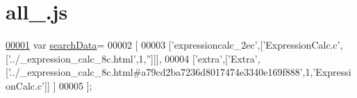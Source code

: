 \hypertarget{all__2_8js_source}{\section{all\+\_.\+js}
\label{all__2_8js_source}
}

\begin{DoxyCode}
\hypertarget{all__2_8js_source_l00001}{}\hyperlink{all__2_8js_ad01a7523f103d6242ef9b0451861231e}{00001} var \hyperlink{all__2_8js_ad01a7523f103d6242ef9b0451861231e}{searchData}=
00002 [
00003   [\textcolor{stringliteral}{'expressioncalc\_2ec'},[\textcolor{stringliteral}{'ExpressionCalc.c'},[\textcolor{stringliteral}{'../\_expression\_calc\_8c.html'},1,\textcolor{stringliteral}{''}]]],
00004   [\textcolor{stringliteral}{'extra'},[\textcolor{stringliteral}{'Extra'},[\textcolor{stringliteral}{'../\_expression\_calc\_8c.html#a79cd2ba7236d8017474e3340e169f888'},1,\textcolor{stringliteral}{'ExpressionCalc.c'}]]
      ]
00005 ];
\end{DoxyCode}
